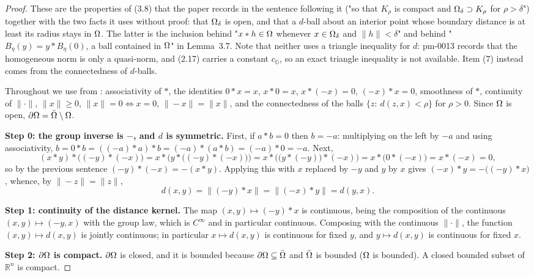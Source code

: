 \begin{proof}
These are the properties of (3.8) that the paper records in the sentence following it
("so that $K_\rho$ is compact and $\Omega_\delta\supset K_\rho$ for $\rho>\delta$") together
with the two facts it uses without proof: that $\Omega_\delta$ is open, and that a $d$-ball
about an interior point whose boundary distance is at least its radius stays in $\Omega$. The
latter is the inclusion behind "$x*h\in\Omega$ whenever $x\in\Omega_\delta$ and $\|h\|<\delta$"
and behind "$B_\eta(y)=y*B_\eta(0)$, a ball contained in $\Omega$" in Lemma~3.7. Note that
neither uses a triangle inequality for $d$: pm-0013 records that the homogeneous norm is
only a quasi-norm, and (2.17) carries a constant $c_{\mathbb G}$, so an exact triangle
inequality is not available. Item (7) instead comes from the connectedness of $d$-balls.

Throughout we use from : associativity of $*$, the identities
$0*x=x$, $x*0=x$, $x*(-x)=0$, $(-x)*x=0$, smoothness of $*$, continuity of $\|\cdot\|$,
$\|x\|\ge0$, $\|x\|=0\iff x=0$, $\|-x\|=\|x\|$, and the connectedness of the balls
$\{z:\ d(z,x)<\rho\}$ for $\rho>0$. Since $\Omega$ is open, $\partial\Omega=\bar{\Omega}\setminus\Omega$.

\medskip\noindent\textbf{Step 0: the group inverse is $-$, and $d$ is symmetric.} First, if
$a*b=0$ then $b=-a$: multiplying on the left by $-a$ and using associativity,
$b=0*b=((-a)*a)*b=(-a)*(a*b)=(-a)*0=-a$. Next,
\[
 (x*y)*\big((-y)*(-x)\big)=x*\Big(y*\big((-y)*(-x)\big)\Big)=x*\Big(\big(y*(-y)\big)*(-x)\Big)
 =x*\big(0*(-x)\big)=x*(-x)=0 ,
\]
so by the previous sentence $(-y)*(-x)=-(x*y)$. Applying this with $x$ replaced by $-y$ and
$y$ by $x$ gives $(-x)*y=-\big((-y)*x\big)$, whence, by $\|-z\|=\|z\|$,
\[
 d(x,y)=\big\|(-y)*x\big\|=\big\|(-x)*y\big\|=d(y,x). \tag{1}
\]

\medskip\noindent\textbf{Step 1: continuity of the distance kernel.} The map
$(x,y)\mapsto(-y)*x$ is continuous, being the composition of the continuous
$(x,y)\mapsto(-y,x)$ with the group law, which is $C^{\infty}$ and in particular continuous.
Composing with the continuous $\|\cdot\|$, the function $(x,y)\mapsto d(x,y)$ is jointly
continuous; in particular $x\mapsto d(x,y)$ is continuous for fixed $y$, and
$y\mapsto d(x,y)$ is continuous for fixed $x$.

\medskip\noindent\textbf{Step 2: $\partial\Omega$ is compact.} $\partial\Omega$ is closed, and it is
bounded because $\partial\Omega\subseteq\bar{\Omega}$ and $\bar{\Omega}$ is bounded ($\Omega$ is bounded). A
closed bounded subset of $\mathbb R^{n}$ is compact.


\end{proof}

